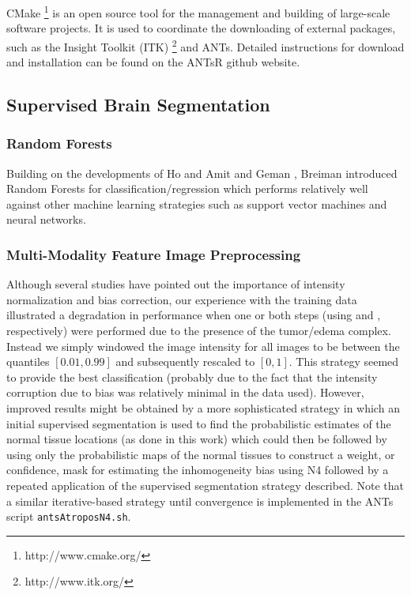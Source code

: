 \documentclass[final,5p,times,twocolumn]{elsarticle}
\begin{document}
CMake%
\footnote{
http://www.cmake.org/
}
is an open source tool for the management and building of 
large-scale software projects.  It is used
to coordinate the downloading of external packages,
such as the Insight Toolkit (ITK)%
\footnote{
http://www.itk.org/
}
and ANTs.  Detailed instructions for download and
installation can be found on the ANTsR github website.



\subsection{Supervised Brain Segmentation}



\subsubsection{Random Forests}

Building on the developments of Ho \cite{ho1995} and Amit and Geman \cite{amit1997},
Breiman introduced Random Forests for classification/regression \cite{breiman2001} which performs relatively well against other machine learning strategies such as support vector machines and neural networks.

\subsubsection{Multi-Modality Feature Image Preprocessing}

Although several studies have pointed out the importance of
intensity normalization and bias correction, our experience 
with the training data illustrated a degradation in performance
when one or both steps (using \cite{nyul2000} and \cite{tustison2010},
respectively) were performed due to the presence of the tumor/edema complex.  
Instead we simply windowed the image intensity
for all images to be between the quantiles $[0.01,0.99]$ and
subsequently rescaled to $[0,1]$.  This strategy seemed to provide 
the best classification (probably due to the fact that the intensity
corruption due to bias was relatively minimal in the data used).
However, improved results might be obtained
by a more sophisticated strategy in which an initial supervised segmentation 
is used to find the probabilistic estimates of the normal tissue
locations (as done in this work) which could then be followed by using
only the probabilistic maps of the normal tissues to construct a
weight, or confidence, mask for estimating the inhomogeneity bias
using N4 \cite{tustison2010} followed by a repeated application of 
the supervised segmentation strategy described.  Note that a similar
iterative-based strategy until convergence is implemented in the ANTs script \verb#antsAtroposN4.sh#.
\end{document}
